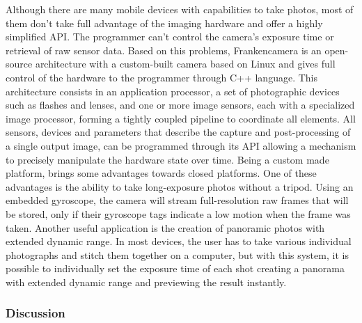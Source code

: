  Although there are many mobile devices with capabilities to take photos, most of them don’t take full advantage of the imaging hardware and offer a highly simplified API. The programmer can’t control the camera’s exposure time or retrieval of raw sensor data. Based on this problems, Frankencamera is an open-source architecture with a custom-built camera based on Linux and gives full control of the hardware to the programmer through C++ language. This architecture consists in an application processor, a set of photographic devices such as flashes and lenses, and one or more image sensors, each with a specialized image processor, forming a tightly coupled pipeline to coordinate all elements. All sensors, devices and parameters that describe the capture and post-processing of a single output image, can be programmed through its API allowing a mechanism to precisely manipulate the hardware state over time.
Being a custom made platform, brings some advantages towards closed platforms. One of these advantages is the ability to take long-exposure photos without a tripod. Using an embedded gyroscope, the camera will stream full-resolution raw frames that will be stored, only if their gyroscope tags indicate a low motion when the frame was taken. 
Another useful application is the creation of panoramic photos with extended dynamic range. In most devices, the user has to take various individual photographs and stitch them together on a computer, but with this system, it is possible to individually set the exposure time of each shot creating a panorama with extended dynamic range and previewing the result instantly.

\subsubsection{Discussion}

